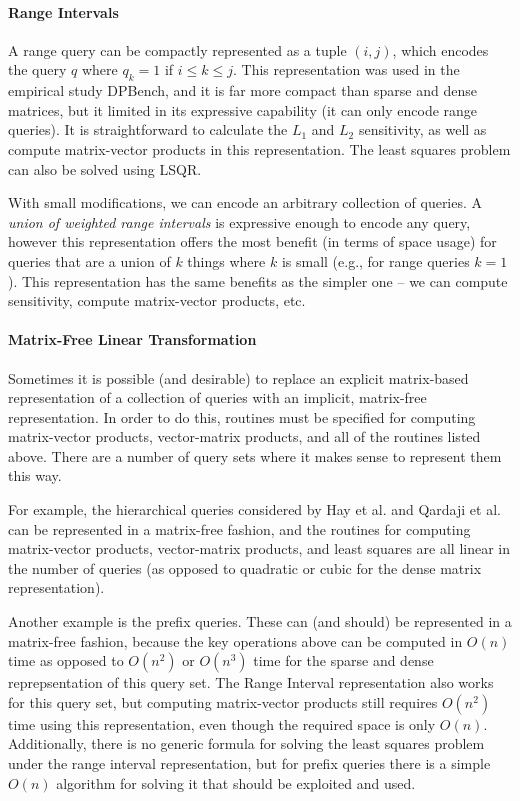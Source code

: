 \paragraph*{Range Intervals}

A range query can be compactly represented as a tuple $(i,j)$, which encodes the query $ q $ where $q_k = 1 $ if $ i \leq k \leq j$.  This representation was used in the empirical study DPBench, and it is far more compact than sparse and dense matrices, but it limited in its expressive capability (it can only encode range queries).  It is straightforward to calculate the $L_1$ and $L_2$ sensitivity, as well as compute matrix-vector products in this representation.  The least squares problem can also be solved using LSQR.  

With small modifications, we can encode an arbitrary collection of queries.  A \emph{union of weighted range intervals} is expressive enough to encode any query, however this representation offers the most benefit (in terms of space usage) for queries that are a union of $k$ things where $k$ is small (e.g., for range queries $k=1$).  This representation has the same benefits as the simpler one -- we can compute sensitivity, compute matrix-vector products, etc. 

\paragraph*{Matrix-Free Linear Transformation}

Sometimes it is possible (and desirable) to replace an explicit matrix-based representation of a collection of queries with an implicit, matrix-free representation.  In order to do this, routines must be specified for computing matrix-vector products, vector-matrix products, and all of the routines listed above.  There are a number of query sets where it makes sense to represent them this way.  

For example, the hierarchical queries considered by Hay et al. and Qardaji et al. can be represented in a matrix-free fashion, and the routines for computing matrix-vector products, vector-matrix products, and least squares are all linear in the number of queries (as opposed to quadratic or cubic for the dense matrix representation).    

Another example is the prefix queries.  These can (and should) be represented in a matrix-free fashion, because the key operations above can be computed in $O(n)$ time as opposed to $O(n^2)$ or $O(n^3)$ time for the sparse and dense reprepsentation of this query set.  The Range Interval representation also works for this query set, but computing matrix-vector products still requires $O(n^2)$ time using this representation, even though the required space is only $O(n)$.  Additionally, there is no generic formula for solving the least squares problem under the range interval representation, but for prefix queries there is a simple $O(n)$ algorithm for solving it that should be exploited and used.   

